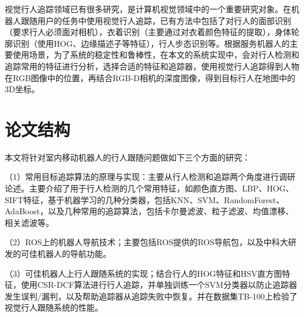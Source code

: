   视觉行人追踪领域已有很多研究，是计算机视觉领域中的一个重要研究对象。在机器人跟随用户的任务中使用视觉行人追踪，已有方法中包括了对行人的面部识别\cite{wong1995mobile,cruz2008real}（要求行人必须面对相机），衣着识别\cite{bellotto2008multimodal,noceti2009combined}（主要通过对衣着颜色特征的提取），身体轮廓识别\cite{alvarez2012feature}（使用HOG、边缘描述子等特征），行人步态识别\cite{mowbray2003automatic,koide2016identification}等。根据服务机器人的主要使用场景，为了系统的稳定性和鲁棒性，在本文的系统实现中，会对行人检测和追踪常用的特征进行分析，选择合适的特征和追踪器，使用视觉行人追踪得到人物在RGB图像中的位置，再结合RGB-D相机的深度图像，得到目标行人在地图中的3D坐标。

\section{论文结构}
  本文将针对室内移动机器人的行人跟随问题做如下三个方面的研究：

  （1）常用目标追踪算法的原理与实现：主要从行人检测和追踪两个角度进行调研论述。主要介绍了用于行人检测的几个常用特征，如颜色直方图、LBP、HOG、SIFT特征，基于机器学习的几种分类器，包括KNN、SVM、RandomForest、AdaBoost，以及几种常用的追踪算法，包括卡尔曼滤波、粒子滤波、均值漂移、相关滤波等。

  （2）ROS上的机器人导航技术；主要包括ROS提供的ROS导航包，以及中科大研发的可佳机器人的导航功能。

  （3）可佳机器人上行人跟随系统的实现；结合行人的HOG特征和HSV直方图特征，使用CSR-DCF算法进行行人追踪，并单独训练一个SVM分类器以防止追踪器发生误判/漏判，以及帮助追踪器从追踪失败中恢复。并在数据集TB-100\cite{Wu2015Object}上检验了视觉行人跟随系统的性能。